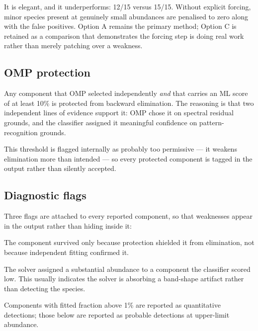\documentclass[11pt,a4paper]{article}
\newcommand{\code}[1]{\texttt{\small #1}}
\begin{document}
It is elegant, and it underperforms: 12/15 versus 15/15. Without explicit
forcing, minor species present at genuinely small abundances are penalised
to zero along with the false positives. Option A remains the primary
method; Option C is retained as a comparison that demonstrates the forcing
step is doing real work rather than merely patching over a weakness.

\subsection{OMP protection}

Any component that OMP selected independently \emph{and} that carries an ML
score of at least 10\% is protected from backward elimination. The
reasoning is that two independent lines of evidence support it: OMP chose
it on spectral residual grounds, and the classifier assigned it meaningful
confidence on pattern-recognition grounds.

This threshold is flagged internally as probably too permissive --- it
weakens elimination more than intended --- so every protected component is
tagged in the output rather than silently accepted.

\subsection{Diagnostic flags}

Three flags are attached to every reported component, so that weaknesses
appear in the output rather than hiding inside it:

\begin{description}[style=nextline, leftmargin=0pt, labelindent=0pt, labelwidth=0pt, labelsep=0pt, itemsep=4pt]
  \item[\code{protected\_only}] The component survived only because
        protection shielded it from elimination, not because independent
        fitting confirmed it.
  \item[\code{solver\_override\_suspect}] The solver assigned a
        substantial abundance to a component the classifier scored low.
        This usually indicates the solver is absorbing a band-shape
        artifact rather than detecting the species.
  \item[Quantitative / probabilistic split] Components with fitted
        fraction above 1\% are reported as quantitative detections; those
        below are reported as probable detections at upper-limit abundance.
\end{description}
\end{document}
